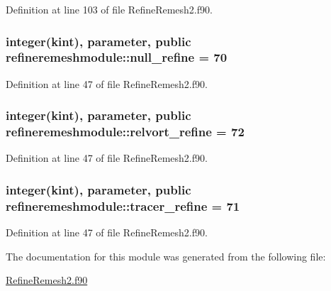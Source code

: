 Definition at line 103 of file Refine\+Remesh2.\+f90.

\hypertarget{classrefineremeshmodule_a886ebca459697b07b2016e2760626483}{
\subsubsection[{null\+\_\+refine}]{\setlength{\rightskip}{0pt plus 5cm}integer(kint), parameter, public refineremeshmodule\+::null\+\_\+refine = 70}}\label{classrefineremeshmodule_a886ebca459697b07b2016e2760626483}


Definition at line 47 of file Refine\+Remesh2.\+f90.

\hypertarget{classrefineremeshmodule_a6b6cb1aeff0463b208981fd3742a2658}{
\subsubsection[{relvort\+\_\+refine}]{\setlength{\rightskip}{0pt plus 5cm}integer(kint), parameter, public refineremeshmodule\+::relvort\+\_\+refine = 72}}\label{classrefineremeshmodule_a6b6cb1aeff0463b208981fd3742a2658}


Definition at line 47 of file Refine\+Remesh2.\+f90.

\hypertarget{classrefineremeshmodule_a758dcc52144ccbbeff17194a233d1c48}{
\subsubsection[{tracer\+\_\+refine}]{\setlength{\rightskip}{0pt plus 5cm}integer(kint), parameter, public refineremeshmodule\+::tracer\+\_\+refine = 71}}\label{classrefineremeshmodule_a758dcc52144ccbbeff17194a233d1c48}


Definition at line 47 of file Refine\+Remesh2.\+f90.



The documentation for this module was generated from the following file\+:\begin{DoxyCompactItemize}
\item 
\hyperlink{RefineRemesh2_8f90}{Refine\+Remesh2.\+f90}\end{DoxyCompactItemize}
